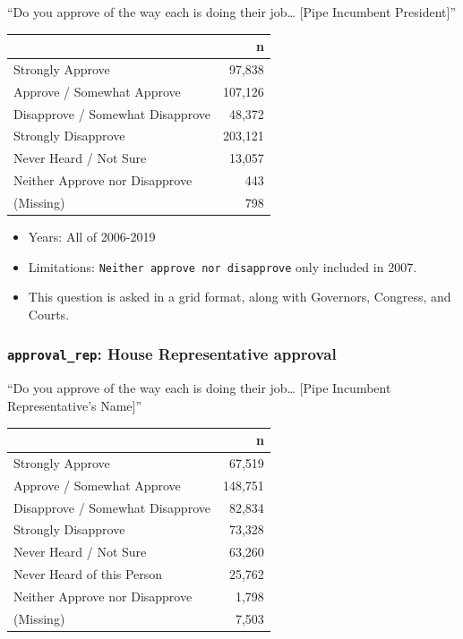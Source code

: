 \documentclass[10pt,article,oneside]{memoir}
\theoremstyle{definition}
\begin{document}
``Do you approve of the way each is doing their job\ldots{} {[}Pipe
Incumbent President{]}''

\begin{table}[H]
\centering
\begin{tabular}{lr}
\toprule
 & n\\
\midrule
Strongly Approve & 97,838\\
Approve / Somewhat Approve & 107,126\\
Disapprove / Somewhat Disapprove & 48,372\\
Strongly Disapprove & 203,121\\
Never Heard / Not Sure & 13,057\\
Neither Approve nor Disapprove & 443\\
(Missing) & 798\\
\bottomrule
\end{tabular}
\end{table}

\begin{itemize}
\tightlist
\item
  Years: All of 2006-2019
\item
  Limitations: \texttt{Neither\ approve\ nor\ disapprove} only included
  in 2007.
\item
  This question is asked in a grid format, along with Governors,
  Congress, and Courts.
\end{itemize}

\hypertarget{approval_rep-house-representative-approval}{%
\subsubsection{\texorpdfstring{\texttt{approval\_rep}: House
Representative
approval}{approval\_rep: House Representative approval}}\label{approval_rep-house-representative-approval}}

``Do you approve of the way each is doing their job\ldots{} {[}Pipe
Incumbent Representative's Name{]}''

\begin{table}[H]
\centering
\begin{tabular}{lr}
\toprule
 & n\\
\midrule
Strongly Approve & 67,519\\
Approve / Somewhat Approve & 148,751\\
Disapprove / Somewhat Disapprove & 82,834\\
Strongly Disapprove & 73,328\\
Never Heard / Not Sure & 63,260\\
Never Heard of this Person & 25,762\\
Neither Approve nor Disapprove & 1,798\\
(Missing) & 7,503\\
\bottomrule
\end{tabular}
\end{table}
\end{document}
